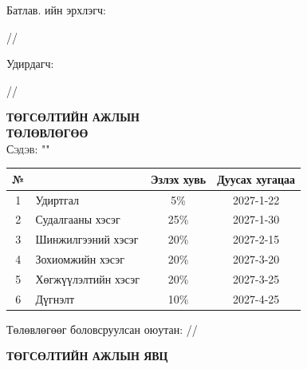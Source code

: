 
\begin{titlepage}

\vspace*{0.5cm}
Батлав. \deptname ийн эрхлэгч: 
\begin{flushright}
\makebox[2cm]{\dotfill} /\chairname/ 
\end{flushright}

Удирдагч: 
\begin{flushright}
\makebox[4cm]{\dotfill} /\supname/
\end{flushright}

\begin{center}

\vspace*{2cm}
\textbf{{\large ТӨГСӨЛТИЙН АЖЛЫН \\ ТӨЛӨВЛӨГӨӨ}}\\[0.5cm]

\textsc{\large Сэдэв: "\ttitle"}\\[0.5cm]

\begin{tabular}{|c|p{7cm}|c|c|}
	\hline
	№ & \makebox[7cm][c]{Ажлын бүлэг, хэсгийн нэр} & Эзлэх хувь & Дуусах хугацаа \\ \hline
	1 & {Удиртгал}         &  5\% & 2027-1-22 \\ \hline
	2 & {Судалгааны хэсэг}     & 25\% & 2027-1-30 \\ \hline
	3 & {Шинжилгээний хэсэг} & 20\% & 2027-2-15 \\ \hline
	4 & {Зохиомжийн хэсэг}    & 20\% & 2027-3-20 \\ \hline
	5 & {Хөгжүүлэлтийн хэсэг}  & 20\% & 2027-3-25 \\ \hline
        6 & {Дүгнэлт}          & 10\% & 2027-4-25 \\ \hline
\end{tabular}

\vspace{2cm}
Төлөвлөгөөг боловсруулсан оюутан: \makebox[3cm]{\dotfill} /\shortname/

\end{center}

\newpage

\begin{center}

\vspace*{2cm}
\textbf{{\large ТӨГСӨЛТИЙН АЖЛЫН ЯВЦ}}\\[0.5cm]


\end{center}
\end{titlepage}
